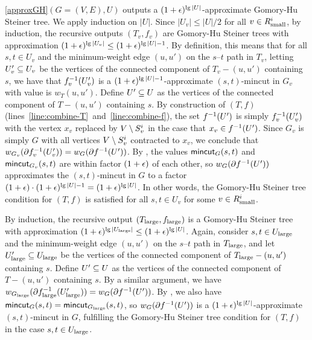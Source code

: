 \BL{}
\ref{approxGH}$(G=(V,E),U)$ outputs a $(1+\epsilon)^{\lg|U|}$-approximate Gomory-Hu Steiner tree.
\EL
\BP
We apply induction on $|U|$. 
Since $|U_v|\le|U|/2$ for all $v\in R^i_{\textup{small}}$, by induction, the recursive outputs $(T_v,f_v)$ are Gomory-Hu Steiner trees with approximation $(1+\epsilon)^{\lg|U_v|}\le(1+\epsilon)^{\lg|U|-1}$.  By definition, this means that for all $s,t\in U_v$ and the minimum-weight edge $(u,u')$ on the $s$--$t$ path in $T_v$, letting $U'_v\subseteq U_v$ be the vertices of the connected component of $T_v-(u,u')$ containing $s$, we have that $f^{-1}_v(U'_v)$ is a $(1+\epsilon)^{\lg|U|-1}$-approximate $(s,t)$-mincut in $G_v$ with value is $w_T(u,u')$. Define $U'\subseteq U$ as the vertices of the connected component of $T-(u,u')$ containing $s$. By construction of $(T,f)$ (lines~\ref{line:combine-T}~and~\ref{line:combine-f}), the set $f^{-1}(U')$ is simply $f^{-1}_v(U'_v)$ with the vertex $x_v$ replaced by $V\setminus S^i_v$ in the case that $x_v\in f^{-1}(U')$. Since $G_v$ is simply $G$ with all vertices $V\setminus S^i_v$ contracted to $x_v$, we conclude that $w_{G_v}(\partial f^{-1}_v(U'_v)) = w_G(\partial f^{-1}(U'))$. By , the values $\textsf{\textup{mincut}}_G(s,t)$ and $\textsf{\textup{mincut}}_{G_v}(s,t)$ are within factor $(1+\epsilon)$ of each other, so $w_G(\partial f^{-1}(U'))$ approximates the $(s,t)$-mincut in $G$ to a factor $(1+\epsilon)\cdot(1+\epsilon)^{\lg|U|-1} = (1+\epsilon)^{\lg|U|}$. In other words, the Gomory-Hu Steiner tree condition for $(T,f)$ is satisfied for all $s,t\in U_v$ for some $v\in R^i_{\textup{small}}$.

By induction, the recursive output $(T_{\textup{large}},f_{\textup{large}})$ is a Gomory-Hu Steiner tree with approximation $(1+\epsilon)^{\lg|U_{\textup{large}}|}\le(1+\epsilon)^{\lg|U|}$. Again, consider $s,t\in U_{\textup{large}}$ and the minimum-weight edge $(u,u')$ on the $s$--$t$ path in $T_{\textup{large}}$, and let $U'_{\textup{large}}\subseteq U_{\textup{large}}$ be the vertices of the connected component of $T_{\textup{large}}-(u,u')$ containing $s$. Define $U'\subseteq U$ as the vertices of the connected component of $T-(u,u')$ containing $s$. By a similar argument, we have $w_{G_{\textup{large}}}(\partial f^{-1}_{\textup{large}}(U'_{\textup{large}})) = w_G(\partial f^{-1}(U'))$. By , we also have $\textsf{\textup{mincut}}_G(s,t)=\textsf{\textup{mincut}}_{G_{\textup{large}}}(s,t)$, so $w_G(\partial f^{-1}(U'))$ is a $(1+\epsilon)^{\lg|U|}$-approximate $(s,t)$-mincut in $G$, fulfilling the Gomory-Hu Steiner tree condition for $(T,f)$ in the case $s,t\in U_{\textup{large}}$.


